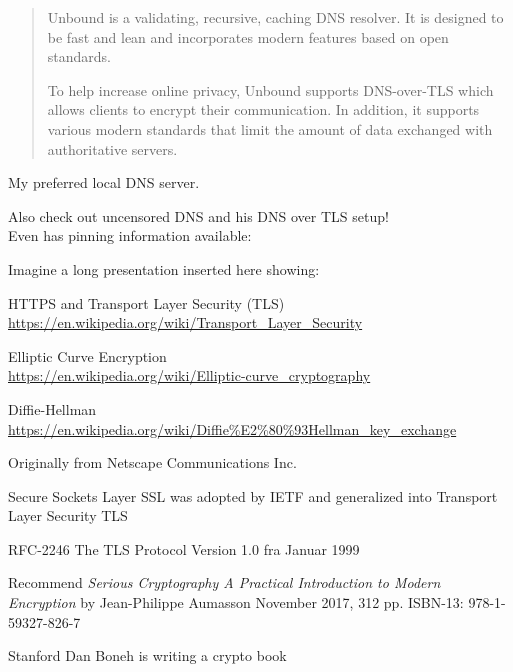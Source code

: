 \documentclass[Screen16to9,17pt]{foils}
\begin{document}



\begin{quote}
Unbound is a validating, recursive, caching DNS resolver. It is designed to be fast and lean and incorporates modern features based on open standards.

To help increase online privacy, Unbound supports DNS-over-TLS which allows clients to encrypt their communication. In addition, it supports various modern standards that limit the amount of data exchanged with authoritative servers.
\end{quote}


My preferred local DNS server.

Also check out uncensored DNS and his DNS over TLS setup!\\
Even has pinning information available:\\ {\small{}}







 Imagine a long presentation inserted here showing:
\begin{list2}
\item HTTPS and Transport Layer Security (TLS)\\ \url{https://en.wikipedia.org/wiki/Transport_Layer_Security}
\item Elliptic Curve Encryption\\
\url{https://en.wikipedia.org/wiki/Elliptic-curve_cryptography}
\item Diffie-Hellman\\
 \url{https://en.wikipedia.org/wiki/Diffie%E2%80%93Hellman_key_exchange}
\end{list2}



\begin{list2}
\item Originally from Netscape Communications Inc.
\item Secure Sockets Layer SSL was adopted by IETF and generalized into Transport Layer Security TLS

\item RFC-2246 The TLS Protocol Version 1.0 fra Januar 1999
\item Recommend \emph{Serious Cryptography
A Practical Introduction to Modern Encryption}
by Jean-Philippe Aumasson
November 2017, 312 pp.
ISBN-13:
978-1-59327-826-7
\item Stanford Dan Boneh is writing a crypto book\\ 
\end{list2}
\end{document}
